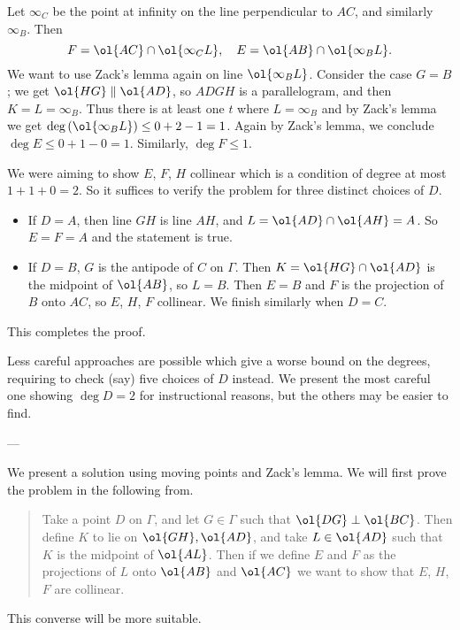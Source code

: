 Let $\infty_C$ be the point at infinity
on the line perpendicular to $AC$, and similarly $\infty_B$.
Then \[ F = \ol{AC} \cap \ol{\infty_C L},
  \quad E = \ol{AB} \cap \ol{\infty_B L}. \]
We want to use Zack's lemma again on line $\ol{\infty_B L}$.
Consider the case $G = B$;
we get $\ol{HG} \parallel \ol{AD}$,
so $ADGH$ is a parallelogram,
and then $K = L = \infty_B$.
Thus there is at least one $t$ where $L = \infty_B$
and by Zack's lemma we get
$\deg\left( \ol{\infty_B L} \right) \le 0 + 2 - 1 = 1$.
Again by Zack's lemma,
we conclude $\deg E \le 0 + 1 - 0 = 1$.
Similarly, $\deg F \le 1$.

We were aiming to show $E$, $F$, $H$ collinear
which is a condition of degree at most $1 + 1 + 0 = 2$.
So it suffices to verify the problem for three distinct choices of $D$.
\begin{itemize}
\item If $D=A$, then line $GH$ is line $AH$,
  and $L = \ol{AD} \cap \ol{AH} = A$.
  So $E=F=A$ and the statement is true.
\item If $D=B$, $G$ is the antipode of $C$ on $\Gamma$.
  Then $K = \ol{HG} \cap \ol{AD}$ is the midpoint of $\ol{AB}$, so $L=B$.
  Then $E=B$ and $F$ is the projection of $B$ onto $AC$,
  so $E$, $H$, $F$ collinear.
\ii We finish similarly when $D=C$.
\end{itemize}
This completes the proof.

\begin{remark*}
  Less careful approaches are possible
  which give a worse bound on the degrees,
  requiring to check (say) five choices of $D$ instead.
  We present the most careful one showing $\deg D = 2$
  for instructional reasons, but the others may be easier to find.
\end{remark*}

---

We present a solution using moving points and Zack's lemma.
We will first prove the problem in the following from.
\begin{quote}
Take a point $D$ on $\Gamma$,
and let $G\in \Gamma$ such that $\ol{DG} \perp \ol{BC}$.
Then define $K$ to lie on $\ol{GH}, \ol{AD}$,
and take $L \in \ol{AD}$ such that $K$ is the midpoint of $\ol{AL}$.
Then if we define $E$ and $F$ as the projections of $L$ onto $\ol{AB}$ and $\ol{AC}$
we want to show that $E$, $H$, $F$ are collinear.
\end{quote}
This converse will be more suitable.

